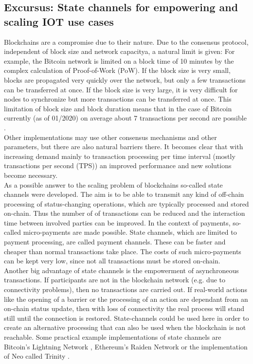 \documentclass[conference]{IEEEtran}
\begin{document}
\subsection{Excursus: State channels for empowering and scaling IOT use cases}
Blockchains are a compromise due to their nature. Due to the consensus protocol, independent of block size and network capacitya, a natural limit is given: For example, the Bitcoin network \cite{nakamoto2009} is limited on a block time of 10 minutes by the complex calculation of Proof-of-Work (PoW). If the block size is very small, blocks are propagated very quickly over the network, but only a few transactions can be transferred at once. If the block size is very large, it is very difficult for nodes to synchronize but more transactions can be transferred at once. This limitation of block size and block duration means that in the case of Bitcoin currently (as of 01/2020) on average about 7 transactions per second are possible \cite{Macdonald2017}.\\
Other implementations may use other consensus mechanisms and other parameters, but there are also natural barriers there. It becomes clear that with increasing demand mainly to transaction processing per time interval (mostly transactions per second (TPS)) an improved performance and new solutions become necessary. \cite{Macdonald2017}\\
As a possible answer to the scaling problem of blockchains so-called state channels were developed. The aim is to be able to transmit any kind of off-chain processing of status-changing operations, which are typically processed and stored on-chain. Thus the number of of transactions can be reduced and the interaction time between involved parties can be improved. In the context of payments, so-called micro-payments are made possible. State channels, which are limited to payment processing, are called payment channels. These can be faster and cheaper than normal transactions take place. The costs of such micro-payments can be kept very low, since not all transactions must be stored on-chain. \cite{Coleman2018}\\
Another big advantage of state channels is the empowerment of asynchroneous transactions. If participants are not in the blockchain network (e.g. due to connectivity problems), then no transactions are carried out. If real-world actions like the opening of a barrier or the processing of an action are dependant from an on-chain status update, then with loss of connectivity the real process will stand still until the connection is restored. State-channels could be used here in order to create an alternative processing that can also be used when the blockchain is not reachable. Some practical example implementations of state channels are Bitcoin's Lightning Network \cite{Lightning2016}, Ethereum's Raiden Network or the implementation of Neo called Trinity \cite{Trinity2018}.\\
\end{document}
